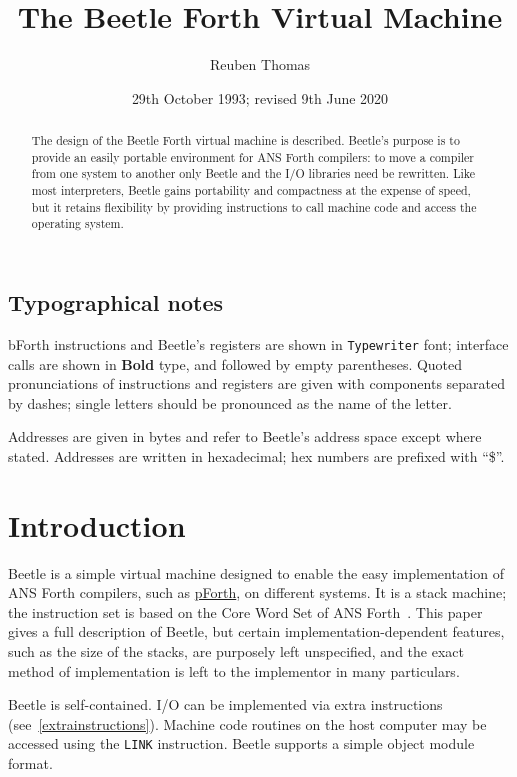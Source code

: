 \documentclass{article}
\title{The Beetle Forth Virtual Machine}
\author{Reuben Thomas}
\date{29th October 1993; revised 9th June 2020}
\newlength{\pronunc}\pronunc=1.7in
\begin{document}
\maketitle

\begin{abstract}
\noindent The design of the Beetle Forth virtual machine is described.
Beetle's purpose is to provide an easily portable environment for ANS Forth
compilers: to move a compiler from one system to another only Beetle and the I/O
libraries need be rewritten. Like most interpreters, Beetle gains portability
and compactness at the expense of speed, but it retains flexibility by providing
instructions to call machine code and access the operating system.
\end{abstract}


\subsection*{Typographical notes}

bForth instructions and Beetle's registers are shown in {\tt Typewriter} font;
interface calls are shown in {\bf Bold} type, and followed by empty parentheses.
Quoted pronunciations of instructions and registers are given with components
separated by dashes; single letters should be pronounced as the name of the
letter.

Addresses are given in bytes and refer to Beetle's address space except where
stated. Addresses are written in hexadecimal; hex numbers are prefixed with
“\$”.


\section{Introduction}

Beetle is a simple virtual machine designed to enable the easy implementation
of ANS Forth compilers, such as \href{https://github.com/rrthomas/pforth}{pForth}, on different systems. It is a stack machine; the instruction set is based on the Core Word Set of
ANS Forth~\cite{ANSIforth}. This paper gives a full description of Beetle, but
certain implementation-dependent features, such as the size of the stacks, are
purposely left unspecified, and the exact method of implementation is left to
the implementor in many particulars.

Beetle is self-contained. I/O can be implemented via extra instructions (see~\ref{extrainstructions}). Machine
code routines on the host computer may be accessed using the {\tt LINK}
instruction. Beetle supports a simple object module format.
\end{document}
